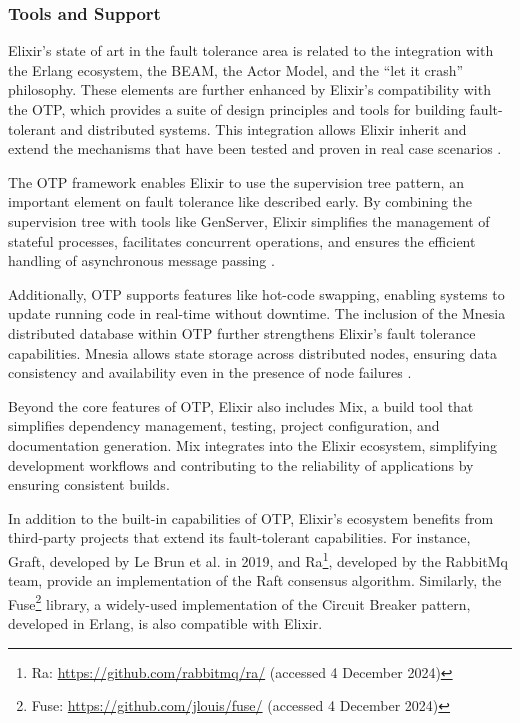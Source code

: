 \subsubsection{Tools and Support}

Elixir’s state of art in the fault tolerance area is related to the integration with the Erlang ecosystem, the \gls{BEAM}, the Actor Model, and the “let it crash” philosophy. These elements are further enhanced by Elixir’s compatibility with the \gls{OTP}, which provides a suite of design principles and tools for building fault-tolerant and distributed systems. This integration allows Elixir inherit and extend the mechanisms that have been tested and proven in real case scenarios \cite{Juric2024,Armstrong2013}.

The \gls{OTP} framework enables Elixir to use the supervision tree pattern, an important element on fault tolerance like described early. By combining the supervision tree with tools like GenServer, Elixir simplifies the management of stateful processes, facilitates concurrent operations, and ensures the efficient handling of asynchronous message passing \cite{elixir-docs-hexdocs}.

Additionally, \gls{OTP} supports features like hot-code swapping, enabling systems to update running code in real-time without downtime. The inclusion of the Mnesia distributed database within \gls{OTP} further strengthens Elixir’s fault tolerance capabilities. Mnesia allows state storage across distributed nodes, ensuring data consistency and availability even in the presence of node failures \cite{elixir-docs-hexdocs,elixir-school}.

Beyond the core features of \gls{OTP}, Elixir also includes Mix, a build tool that simplifies dependency management, testing, project configuration, and documentation generation. Mix integrates into the Elixir ecosystem, simplifying development workflows and contributing to the reliability of applications by ensuring consistent builds\cite{elixir-docs-hexdocs,elixir-school}.

In addition to the built-in capabilities of \gls{OTP}, Elixir’s ecosystem benefits from third-party projects that extend its fault-tolerant capabilities. For instance, Graft, developed by Le Brun et al. \cite{LeBrun2021} in 2019, and Ra\footnote{Ra: \url{https://github.com/rabbitmq/ra/} (accessed 4 December 2024)}, developed by the RabbitMq team, provide an implementation of the Raft consensus algorithm. Similarly, the Fuse\footnote{Fuse: \url{https://github.com/jlouis/fuse/} (accessed 4 December 2024)} library,
a widely-used implementation of the Circuit Breaker pattern, developed in Erlang, is also compatible with Elixir.

